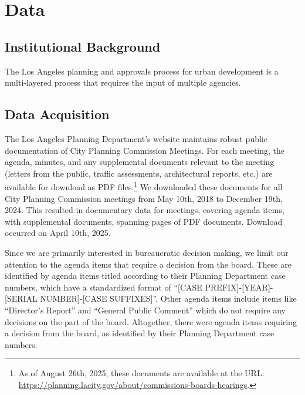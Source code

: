 \section{Data}\label{sec_data}

\subsection{Institutional Background}

The Los Angeles planning and approvals process for urban development is a multi-layered process that requires the input of multiple agencies. 


\subsection{Data Acquisition}

The Los Angeles Planning Department's website maintains robust public documentation of City Planning Commission Meetings. For each meeting, the agenda, minutes, and any supplemental documents relevant to the meeting (letters from the public, traffic assessments, architectural reports, etc.) are available for download as PDF files.\footnote{As of August 26th, 2025, these documents are available at the URL: \url{https://planning.lacity.gov/about/commissions-boards-hearings}.} We downloaded these documents for all City Planning Commission meetings from May 10th, 2018 to December 19th, 2024. This resulted in documentary data for  meetings, covering  agenda items, with  supplemental documents, spanning  pages of PDF documents. Download occurred on April 10th, 2025.

Since we are primarily interested in bureaucratic decision making, we limit our attention to the agenda items that require a decision from the board. These are identified by agenda items titled according to their Planning Department case numbers, which have a standardized format of ``[CASE PREFIX]-[YEAR]-[SERIAL NUMBER]-[CASE SUFFIXES]''. Other agenda items include items like ``Director's Report'' and ``General Public Comment'' which do not require any decisions on the part of the board. Altogether, there were  agenda items requiring a decision from the board, as identified by their Planning Department case numbers.

